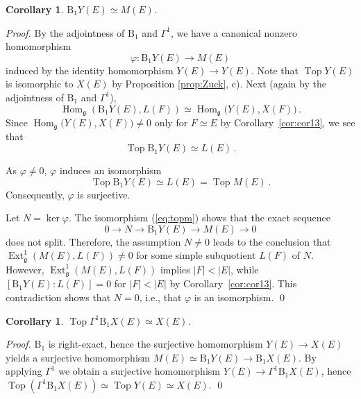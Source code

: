 \documentclass{tglat2e}
\newtheorem{corollary}[theorem]{Corollary}
\theoremstyle{definition}
\theoremstyle{remark}
\renewcommand{\gg}{\mathfrak{g}}
\DeclareMathOperator{\Hom}{Hom}
\DeclareMathOperator{\TopM}{Top}
\begin{document}
	\begin{corollary}
		$\mathrm{B}_1Y(E)\simeq M(E)$.
		\label{cor:cor14}
	\end{corollary}
	
	\begin{proof}
		By the adjointness of $\mathrm{B}_1$ and $\Gamma^1$, we have a canonical nonzero homomorphism
		\begin{equation*}
			\varphi:\mathrm{B}_1Y(E)\to M(E)
		\end{equation*}
		induced by the identity homomorphism $Y(E)\to Y(E)$.  Note that $\TopM Y(E)$ is isomorphic to $X(E)$ by Proposition \ref{prop:Zuck}, c).  
Next (again by the adjointness of $\mathrm{B}_1$ and 
$\Gamma^1$),
		\begin{equation*}
			\Hom_\gg\left(\mathrm{B}_1Y(E),L(F)\right)\simeq \Hom_\gg\big(Y(E),X(F)\big)\,.
		\end{equation*}
		Since $\Hom_\gg\big(Y(E),X(F)\big)\neq 0$ only for $F\simeq E$ by Corollary~\ref{cor:cor13}, we see that
		\begin{equation*}
			\TopM \mathrm{B}_1Y(E)\simeq L(E)\,.
		\end{equation*}
		
		As $\varphi\neq 0$, $\varphi$ induces an isomorphism
		\begin{equation}
			\TopM \mathrm{B}_1Y(E)\simeq L(E)=\TopM M(E)\,.
			\label{eq:topm}
		\end{equation}
		Consequently, $\varphi$ is surjective.  
		
		Let $N=\ker\varphi$. The isomorphism (\ref{eq:topm}) shows that the exact sequence
$$0\to N\to \mathrm{B}_1Y(E)\to M(E)\to 0$$
does not split.  Therefore, the assumption $N\neq 0$ leads to the conclusion that
$\operatorname{Ext}^1_{\gg}(M(E),L(F))\neq 0$ for some simple subquotient $L(F)$ of
$N$. However, $\operatorname{Ext}^1_{\gg}(M(E),L(F))$ implies  $|F|<|E|$, while
$\left[\mathrm{B}_1Y(E):L(F)\right]=0$ for $|F|<|E|$ by
Corollary~\ref{cor:cor13}. This contradiction shows that $N=0$, i.e., that $\varphi$ is an 
isomorphism.
	\qed\end{proof}
	
	\begin{corollary}
		$\TopM \Gamma^1\mathrm{B}_1X(E)\simeq X(E)$.
		\label{cor:cor15}
	\end{corollary}
	
	\begin{proof}
		$\mathrm{B}_1$ is right-exact, hence the surjective homomorphism $Y(E)\to X(E)$ yields a surjective homomorphism $M(E)\simeq \mathrm{B}_1Y(E) \to \mathrm{B}_1X(E)$.  By applying $\Gamma^1$ we obtain a surjective homomorphism $Y(E)\to \Gamma^1\mathrm{B}_1X(E)$, hence $\TopM (\Gamma^1\mathrm{B}_1X(E))\simeq \TopM Y(E)\simeq X(E)$.
	\qed\end{proof}
	
\end{document}
